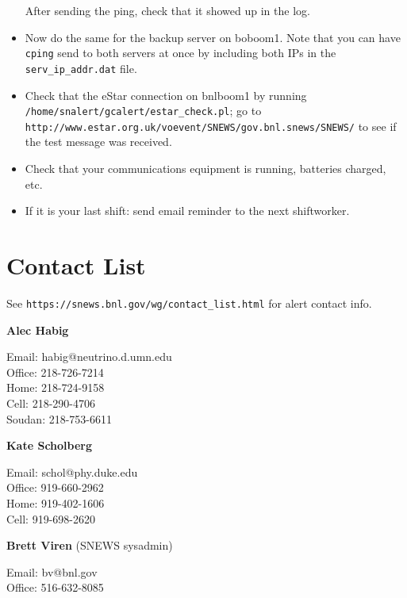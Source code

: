 \documentclass{article}
\begin{document}
\begin{itemize}
After sending the ping, check that it showed up in the log. 

\item Now do the same for the backup server on boboom1.  Note that you 
can have \texttt{cping}
send to both servers at once by including both IPs in the 
\texttt{serv\_ip\_addr.dat} file.

\item Check that the eStar connection on bnlboom1 by running\\
\texttt{/home/snalert/gcalert/estar\_check.pl}; go to
\texttt{http://www.estar.org.uk/voevent/SNEWS/gov.bnl.snews/SNEWS/} to see
if the test message was received.

\item Check that your communications equipment is running,
batteries charged, etc.

\item If it is your last shift: send email reminder to the
next shiftworker.

\end{itemize}

\newpage

\section{Contact List}      


See \texttt{https://snews.bnl.gov/wg/contact\_list.html} for 
alert contact info.\\
\vspace{0.05in}

\noindent
\textbf{Alec Habig}

\noindent
Email: habig@neutrino.d.umn.edu\\
Office: 218-726-7214\\
Home: 218-724-9158\\
Cell: 218-290-4706\\
Soudan: 218-753-6611\\

\vspace{0.05in}

\noindent
\textbf{Kate Scholberg}

\noindent
Email: schol@phy.duke.edu\\
Office: 919-660-2962\\
Home: 919-402-1606 \\
Cell: 919-698-2620\\

\vspace{0.05in}

\noindent
\textbf{Brett Viren} (SNEWS sysadmin)

\noindent
Email: bv@bnl.gov\\
Office: 516-632-8085\\
\end{document}
